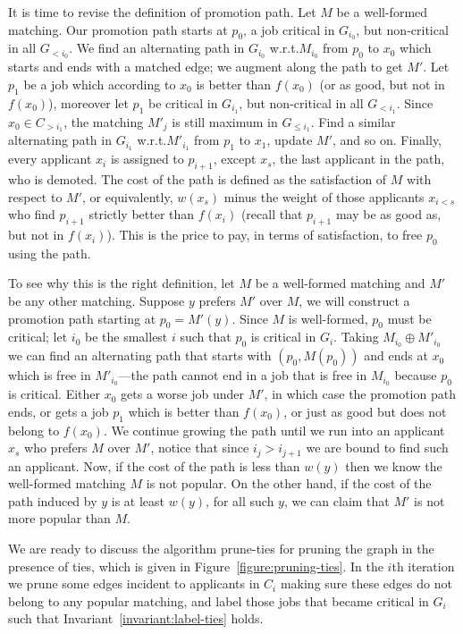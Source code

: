 \documentclass[11pt]{article}
\newcommand{\first}{f}
\newcommand{\wrt}{{w.r.t.}\xspace}
\begin{document}
It is time to revise the definition of promotion path. Let $M$ be a well-formed matching. Our promotion path starts at $p_0$, a job critical in $G_{i_0}$, but non-critical in all $G_{< i_0}$. We find an alternating path in $G_{i_0}$ \wrt $M_{i_0}$ from $p_0$ to $x_0$ which starts and ends with a matched edge; we augment along the path to get $M'$. Let $p_1$ be a job which according to $x_0$ is better than $\first(x_0)$ (or as good, but not in $\first(x_0)$), moreover let $p_1$ be critical in $G_{i_1}$, but non-critical in all $G_{<i_1}$. Since $x_0 \in C_{>i_1}$, the matching $M'_{j}$ is still maximum in $G_{\leq i_1}$. Find a similar alternating path in $G_{i_1}$ \wrt $M'_{i_1}$ from $p_1$ to $x_1$, update $M'$, and so on. Finally, every applicant $x_i$ is assigned to $p_{i+1}$, except $x_s$, the last applicant in the path, who is demoted. The cost of the path is defined as the satisfaction of $M$ with respect to $M'$, or equivalently, $w(x_s)$ minus the weight of those applicants $x_{i<s}$ who find $p_{i+1}$ strictly better than $\first(x_i)$ (recall that $p_{i+1}$ may be as good as, but not in $\first(x_i)$). This is the price to pay, in terms of satisfaction, to free $p_0$ using the path.

To see why this is the right definition, let $M$ be a well-formed matching and $M'$ be any other matching. Suppose $y$ prefers $M'$ over $M$, we will construct a promotion path starting at $p_0 = M'(y)$. Since $M$ is well-formed, $p_0$ must be critical; let $i_0$ be the smallest $i$ such that $p_0$ is critical in $G_i$. Taking $M_{i_0} \oplus M'_{i_0}$ we can find an alternating path that starts with $(p_0, M(p_0) )$ and ends at $x_0$ which is free in $M'_{i_0}$---the path cannot end in a job that is free in $M_{i_0}$ because $p_0$ is critical. Either $x_0$ gets a worse job under $M'$, in which case the promotion path ends, or gets a job $p_1$ which is better than $\first(x_0)$, or just as good but does not belong to $\first(x_0)$. We continue growing the path until we run into an applicant $x_s$ who prefers $M$ over $M'$, notice that since $i_j > i_{j+1}$ we  are bound to find such an applicant. Now, if the cost of the path is less than $w(y)$ then we know the well-formed matching $M$ is not popular. On the other hand, if the cost of the path induced by $y$ is at least $w(y)$, for all such $y$, we can claim that $M'$ is not more popular than $M$.

We are ready to discuss the algorithm {\sc prune-ties} for pruning the graph in the presence of ties, which is given in Figure~\ref{figure:pruning-ties}. In the $i$th iteration we prune some edges incident to applicants in $C_i$ making sure these edges do not belong to any popular matching, and label those jobs that became critical in $G_i$ such that Invariant~\ref{invariant:label-ties} holds.
\end{document}
